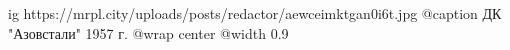  
 
 
 
 

\ifcmt
  ig https://mrpl.city/uploads/posts/redactor/aewceimktgan0i6t.jpg
	@caption ДК "Азовстали" 1957 г.
  @wrap center
  @width 0.9
\fi
